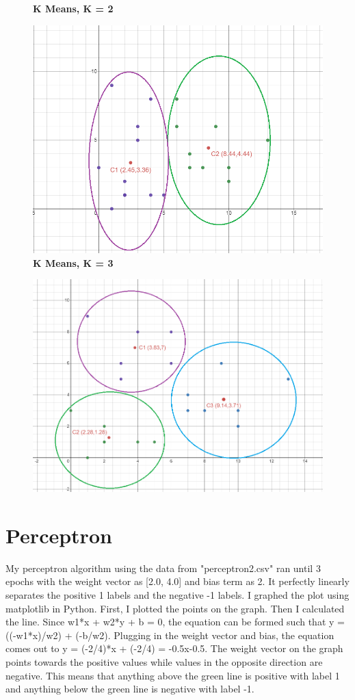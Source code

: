 \documentclass{article}
\begin{document}
\begin{figure}[!htb]
    \centering
    \textbf{K Means, K = 2}\par\medskip
    \includegraphics[width=14cm]{Clusters K = 2}
    \newline
    \textbf{K Means, K = 3}\par\medskip
    \includegraphics[width=15cm]{Clusters K = 3}
\end{figure}

\clearpage
\section*{Perceptron}
My perceptron algorithm using the data from "perceptron\textunderscore2.csv" ran until 3 epochs with the weight vector as [2.0, 4.0] and bias term as 2. It perfectly linearly separates the positive 1 labels and the negative -1 labels. I graphed the plot using matplotlib in Python. First, I plotted the points on the graph. Then I calculated the line. Since w1*x + w2*y + b = 0, the equation can be formed such that y = ((-w1*x)/w2) + (-b/w2). Plugging in the weight vector and bias, the equation comes out to y = (-2/4)*x + (-2/4) = -0.5x-0.5. The weight vector on the graph points towards the positive values while values in the opposite direction are negative. This means that anything above the green line is positive with label 1 and anything below the green line is negative with label -1.
\end{document}
